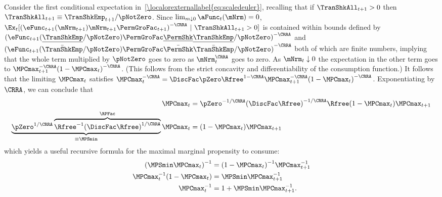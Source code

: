 \documentclass[\econtexRoot/BufferStockTheory]{subfiles}
\begin{document}
Consider the first conditional expectation in~\eqref{\localorexternallabel{eq:scaledeuler}},
recalling that if $\TranShkAll_{t+1}>0$ then $\TranShkAll_{t+1} \equiv
\TranShkEmp_{t+1}/\pNotZero$.  Since $\lim_{m \downarrow 0}
\aFunc_{t}(\mNrm) = 0$,
$\Ex_{t}[{(\eFunc_{t+1}(\mNrm_{t+1})\mNrm_{t+1}\PermGroFac_{t+1})}^{-\CRRA}~|~\TranShkAll_{t+1}>0]$
is contained within bounds defined by
${(\eFunc_{t+1}(\underline{\TranShkEmp}/\pNotZero) \PermGroFac\underline{\PermShk}
\underline{\TranShkEmp}/\pNotZero)}^{-\CRRA}$ and
${(\eFunc_{t+1}(\bar{\TranShkEmp}/\pNotZero) \PermGroFac\bar{\PermShk}
\bar{\TranShkEmp}/\pNotZero)}^{-\CRRA}$ both of which are finite numbers,
implying that the whole term multiplied by $\pNotZero$ goes to zero as
$\mNrm_{t}^{\CRRA}$ goes to zero.  As $\mNrm_{t} \downarrow 0$ the
expectation in the other term goes to $\MPCmax _{t+1}^{-\CRRA
}{(1-\MPCmax _{t})}^{-\CRRA }$. (This follows from the strict concavity
and differentiability of the consumption function.) It follows that
the limiting $\MPCmax_{t}$ satisfies $\MPCmax_{t}^{-\CRRA }=\DiscFac
\pZero\Rfree^{1-\CRRA }\MPCmax_{t+1}^{-\CRRA }{(1-\MPCmax
_{t})}^{-\CRRA }$. Exponentiating by $\CRRA$, we can conclude that
\begin{equation}\begin{gathered}\begin{aligned}
\MPCmax_{t} & = \pZero^{-1/\CRRA} {(\DiscFac
\Rfree)}^{-1/\CRRA}\Rfree(1-\MPCmax _{t})\MPCmax _{t+1} \notag
\\ \underbrace{\pZero^{1/\CRRA}\overbrace{{\Rfree}^{-1}{(\DiscFac
    \Rfree)}^{1/\CRRA}}^{\RPFac}}_{\equiv \MPSmin}
\MPCmax_{t} & = (1-\MPCmax _{t})\MPCmax _{t+1} \label{eq:MPSminDef}
\end{aligned}\end{gathered}\end{equation}
which yields a useful recursive formula for the maximal marginal propensity to consume:
\begin{equation}\begin{gathered}\begin{aligned}
  {(\MPSmin \MPCmax_{t})}^{-1}  & = {(1-\MPCmax_{t})}^{-1}\MPCmax_{t+1}^{-1}  \notag
\\ \MPCmax_{t}^{-1}(1-\MPCmax_{t})  & = \MPSmin \MPCmax_{t+1}^{-1}   \notag
\\ \MPCmax_{t}^{-1}  & = 1+\MPSmin \MPCmax_{t+1}^{-1} \label{eq:MPCmaxInvApndx}.
\end{aligned}\end{gathered}\end{equation}
\end{document}
